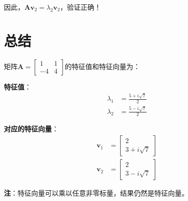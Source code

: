 \documentclass[12pt,a4paper]{article}
\begin{document}
因此，$\bm{A}\bm{v}_2 = \lambda_2 \bm{v}_2$，验证正确！

\section{总结}

矩阵$\bm{A} = \begin{bmatrix} 1 & 1 \\ -4 & 4 \end{bmatrix}$的特征值和特征向量为：

\textbf{特征值}：
\begin{align}
\lambda_1 &= \frac{5 + i\sqrt{7}}{2} \\
\lambda_2 &= \frac{5 - i\sqrt{7}}{2}
\end{align}

\textbf{对应的特征向量}：
\begin{align}
\bm{v}_1 &= \begin{bmatrix} 2 \\ 3 + i\sqrt{7} \end{bmatrix} \\
\bm{v}_2 &= \begin{bmatrix} 2 \\ 3 - i\sqrt{7} \end{bmatrix}
\end{align}

\textbf{注}：特征向量可以乘以任意非零标量，结果仍然是特征向量。
\end{document}
